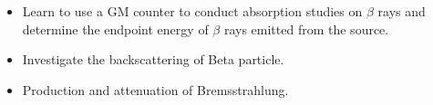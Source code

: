 \begin{itemize}
	\item Learn to use a GM counter to conduct absorption studies on $\beta$ rays and determine the endpoint energy of $\beta$ rays emitted from the source.
	\item Investigate the backscattering of Beta particle.
	\item Production and attenuation of Bremsstrahlung.
\end{itemize}